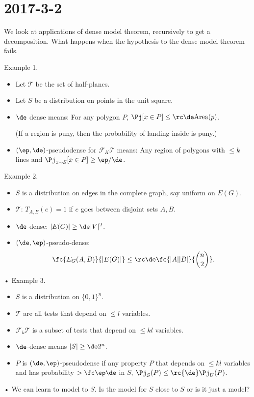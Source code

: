 \section{2017-3-2}

We look at applications of dense model theorem, recursively to get a decomposition. What happens when the hypothesis to the dense model theorem fails.

Example 1.
\begin{itemize}
\item
Let $\mathcal T$ be the set of half-planes.
\item
Let $S$ be a distribution on points in the unit square.
\item
$\de$ dense means: For any polygon $P$, $\Pj[x\in P]\le \rc \de \text{Area}(p)$.

(If a region is puny, then the probability of landing inside is puny.)
\item
$(\ep,\de)$-pseudodense for $\mathcal F_K\mathcal T$ means: Any region of polygons with $\le k$ lines and $\Pj_{x\sim S}[x\in P]\ge \ep/\de$.
\end{itemize}
Example 2.
\begin{itemize}
\item
$S$ is a distribution on edges in the complete graph, say uniform on $E(G)$.
\item
$\mathcal T$: $T_{A,B}(e)=1$ if $e$ goes between disjoint sets $A,B$. 
\item
$\de$-dense: $|E(G)| \ge \de|V|^2$.
\item
$(\de,\ep)$-pseudo-dense: 
$$\fc{E_G(A,B)}{|E(G)|} \le \rc \de \fc{|A||B|}{\binom n2}.
$$
\end{itemize}•
Example 3.
\begin{itemize}
\item
$S$ is a distribution on $\{0,1\}^n$.
\item
$\mathcal T$ are all tests that depend on $\le l$ variables. 
\item
$\mathcal F_k \mathcal T$ is a subset of tests that depend on $\le kl$ variables.
\item
$\de$-dense means $|S|\ge \de 2^n$.
\item
$P$ is $(\de,\ep)$-pseudodense if any property $P$ that depends on $\le kl$ variables and has probability $>\fc\ep\de$ in $S$, $\Pj_S(P)\le \rc{\de} \Pj_U(P)$. 
\end{itemize}•
We can learn to model to $S$. Is the model for $S$ close to $S$ or is it just a model? 

